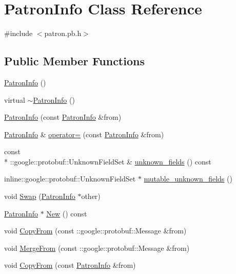 \hypertarget{classPatronInfo}{\section{Patron\-Info Class Reference}
\label{classPatronInfo}
}


{\ttfamily \#include $<$patron.\-pb.\-h$>$}

\subsection*{Public Member Functions}
\begin{DoxyCompactItemize}
\item 
\hyperlink{classPatronInfo_ae02623c5e13529fc011dbba7746c716a}{Patron\-Info} ()
\item 
virtual \hyperlink{classPatronInfo_a0dd38ddeb8feed48aac6c37ccc29d5a7}{$\sim$\-Patron\-Info} ()
\item 
\hyperlink{classPatronInfo_abc18cf076e3826932b73962712786a97}{Patron\-Info} (const \hyperlink{classPatronInfo}{Patron\-Info} \&from)
\item 
\hyperlink{classPatronInfo}{Patron\-Info} \& \hyperlink{classPatronInfo_ae5af3e08365f012b3817001df9014e42}{operator=} (const \hyperlink{classPatronInfo}{Patron\-Info} \&from)
\item 
const \\*
\-::google\-::protobuf\-::\-Unknown\-Field\-Set \& \hyperlink{classPatronInfo_adbe786b63562d55dc70c2e800122f3b0}{unknown\-\_\-fields} () const 
\item 
inline\-::google\-::protobuf\-::\-Unknown\-Field\-Set $\ast$ \hyperlink{classPatronInfo_a21f95cbaef3e5150017905288db1874f}{mutable\-\_\-unknown\-\_\-fields} ()
\item 
void \hyperlink{classPatronInfo_a1fda5ce6527281f3afcc46dcd946f030}{Swap} (\hyperlink{classPatronInfo}{Patron\-Info} $\ast$other)
\item 
\hyperlink{classPatronInfo}{Patron\-Info} $\ast$ \hyperlink{classPatronInfo_a90436ae89e3b21e1695febf67ce48272}{New} () const 
\item 
void \hyperlink{classPatronInfo_a0f5ad133e7faf8a2e89e1c654250c844}{Copy\-From} (const \-::google\-::protobuf\-::\-Message \&from)
\item 
void \hyperlink{classPatronInfo_a466106f8b08726cb65f1665f303117d9}{Merge\-From} (const \-::google\-::protobuf\-::\-Message \&from)
\item 
void \hyperlink{classPatronInfo_a6222f9b0c9d53dec626169a3cbcdbcc9}{Copy\-From} (const \hyperlink{classPatronInfo}{Patron\-Info} \&from)

\end{DoxyCompactItemize}
